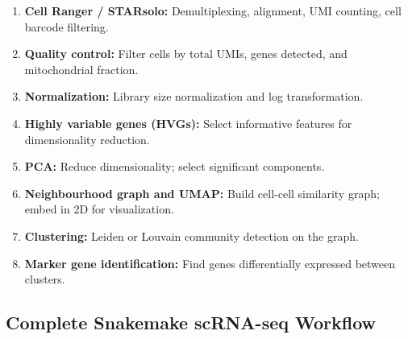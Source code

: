 \begin{enumerate}[itemsep=2pt]
  \item \textbf{Cell Ranger / STARsolo:} Demultiplexing, alignment, UMI counting, cell barcode filtering.
  \item \textbf{Quality control:} Filter cells by total UMIs, genes detected, and mitochondrial fraction.
  \item \textbf{Normalization:} Library size normalization and log transformation.
  \item \textbf{Highly variable genes (HVGs):} Select informative features for dimensionality reduction.
  \item \textbf{PCA:} Reduce dimensionality; select significant components.
  \item \textbf{Neighbourhood graph and UMAP:} Build cell-cell similarity graph; embed in 2D for visualization.
  \item \textbf{Clustering:} Leiden or Louvain community detection on the graph.
  \item \textbf{Marker gene identification:} Find genes differentially expressed between clusters.
\end{enumerate}

\subsection{Complete Snakemake scRNA-seq Workflow}

